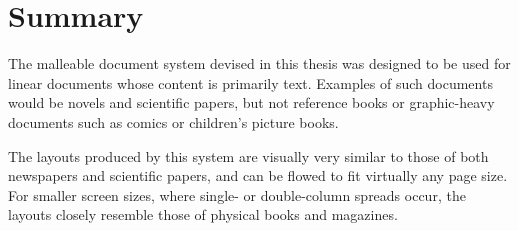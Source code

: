 \section{Summary}
The malleable document system devised in this thesis was designed to be used for linear documents whose content is primarily text. Examples of such documents would be novels and scientific papers, but not reference books or graphic-heavy documents such as comics or children's picture books.

The layouts produced by this system are visually very similar to those of both newspapers and scientific papers, and can be flowed to fit virtually any page size. For smaller screen sizes, where single- or double-column spreads occur, the layouts closely resemble those of physical books and magazines.

